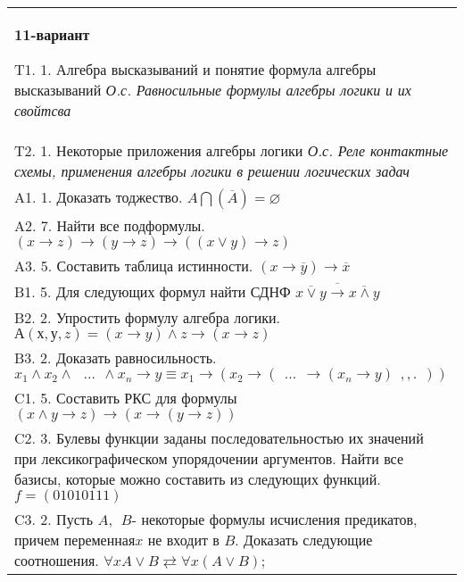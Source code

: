 \documentclass{article}
\begin{document}
\begin{tabular}{m{17cm}}
\textbf{11-вариант}
\newline

T1. 1. Алгебра высказываний и понятие формула алгебры высказываний \emph{О.с. Равносильные формулы алгебры логики и их свойтсва} \\
T2. 1. Некоторые приложения алгебры логики \emph{О.с. Реле контактные схемы, применения алгебры логики в решении логических задач} \\
A1. 1. Доказать тоджество. \(A\bigcap(\overline{A}) = \varnothing\) \\
A2. 7. Найти все подформулы. \((x \rightarrow z) \rightarrow (y \rightarrow z) \rightarrow ((x \vee y) \rightarrow z)\) \\
A3. 5. Составить таблица истинности. \((x \rightarrow \overline{y}) \rightarrow \overline{x}\) \\
B1. 5. Для следующих формул найти СДНФ \(\overline{\overline{x \vee y} \rightarrow \overline{x \land y}}\) \\
B2. 2. Упростить формулу алгебра логики. \(А(х,у,z) = (x \rightarrow y) \land z \rightarrow (x \rightarrow z)\) \\
B3. 2. Доказать равносильность.\(x_{1} \land x_{2} \land \ \ \ ...\ \  \land x_{n} \rightarrow y \equiv x_{1} \rightarrow (x_{2} \rightarrow (\ \ ...\ \  \rightarrow (x_{n} \rightarrow y)\ \ ,,.\ \ ))\) \\
C1. 5. Составить РКС для формулы \((x \land y \rightarrow z) \rightarrow (x \rightarrow (y \rightarrow z))\) \\
C2. 3. Булевы функции заданы последовательностью их значений при лексикографическом упорядочении аргументов. Найти все базисы, которые можно составить из следующих функций. \(f = (01010111)\) \\
C3. 2. Пусть \(A,\ \ B\)- некоторые формулы исчисления предикатов, причем переменная\(x\) не входит в \(B\). Доказать следующие соотношения. \(\forall xA \vee B \rightleftarrows \forall x(A \vee B)\); \\

\end{tabular}
\vspace{1cm}
\end{document}

